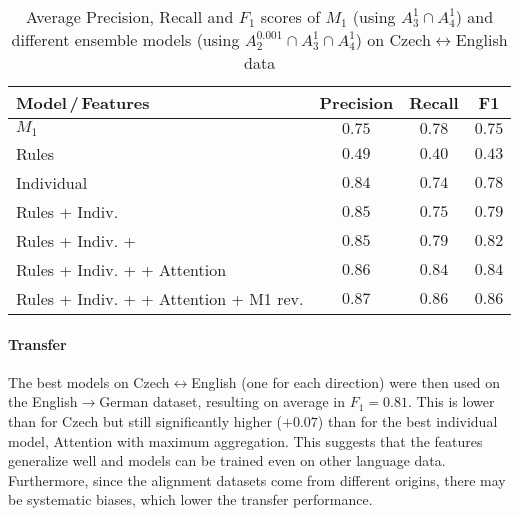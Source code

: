 \begin{table*}[h!]
    \center
    \begin{tabular}{lccc}
        \toprule
        Model\,/\,Features & Precision & Recall & F1 \\
        \midrule
        $M_1$ & $0.75$ & $0.78$ & $0.75$ \\
        Rules & $0.49$ & $0.40$ & $0.43$ \\
        Individual &  $0.84$ & $0.74$ & $0.78$ \\
        Rules + Indiv. & $0.85$ & $0.75$ & $0.79$ \\
        Rules + Indiv. + \fastalign{} & $0.85$ & $0.79$ & $0.82$ \\
        Rules + Indiv. + \fastalign{} + Attention & $0.86$ & $0.84$ & $0.84$ \\
        Rules + Indiv. + \fastalign{} + Attention + M1 rev. & $0.87$ & $0.86$ & $0.86$ \\
        \bottomrule
    \end{tabular}
    \caption{Average Precision, Recall and $F_1$ scores of $M_1$ (using $A_3^{1} \cap A_4^{1}$) and different ensemble models (using $A_2^{0.001} \cap A_3^{1} \cap A_4^{1}$) on Czech$\leftrightarrow$English data \label{tab:ensemble_performance}}
\end{table*}

\paragraph{Transfer} The best models on Czech$\leftrightarrow$English (one for each direction) were then used on the English$\rightarrow$German dataset, resulting on average in $F_1 = 0.81$. This is lower than for Czech but still significantly higher ($+0.07$) than for the best individual model, Attention with maximum aggregation. This suggests that the features generalize well and models can be trained even on other language data. Furthermore, since the alignment datasets come from different origins, there may be systematic biases, which lower the transfer performance.